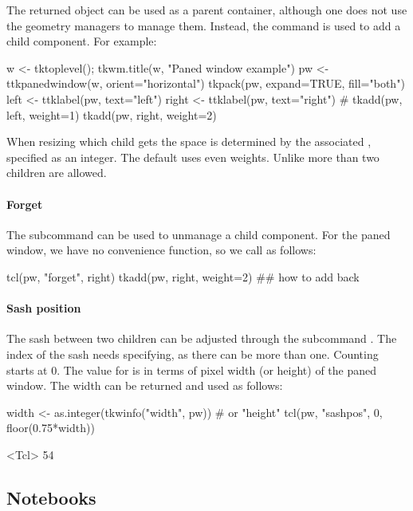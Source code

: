 The returned object can be used as a parent container, although one
does not use the geometry managers to manage them. Instead, the
 command is used to add a child component. For example:
\begin{Schunk}
\begin{Sinput}
 w <- tktoplevel(); tkwm.title(w, "Paned window example")
 pw <- ttkpanedwindow(w, orient="horizontal")
 tkpack(pw, expand=TRUE, fill="both")
 left <- ttklabel(pw, text="left")
 right <- ttklabel(pw, text="right")
 #
 tkadd(pw, left, weight=1)
 tkadd(pw, right, weight=2)
\end{Sinput}
\end{Schunk}
%
When resizing which child gets the space is determined by the
associated , specified as an integer. The default uses
even weights.  Unlike \GTK\/ more than two children are allowed.

\paragraph{Forget}
The subcommand  can be used to
unmanage a child component. For the paned window, we have no
convenience function, so we call as follows:
\begin{Schunk}
\begin{Sinput}
 tcl(pw, "forget", right)
 tkadd(pw, right, weight=2) ## how to add back
\end{Sinput}
\end{Schunk}
%
\paragraph{Sash position}
The sash between two children can be adjusted through the subcommand
. The index of the sash needs
specifying, as there can be more than one. Counting starts at 0. The
value for  is in terms of pixel width (or height) of the
paned window. The width can be returned and used as follows:
\begin{Schunk}
\begin{Sinput}
 width <- as.integer(tkwinfo("width", pw))  # or "height"
 tcl(pw, "sashpos", 0, floor(0.75*width))
\end{Sinput}
\begin{Soutput}
<Tcl> 54 
\end{Soutput}
\end{Schunk}
%

\subsection{Notebooks}
\label{sec:tcltk:notebooks}

